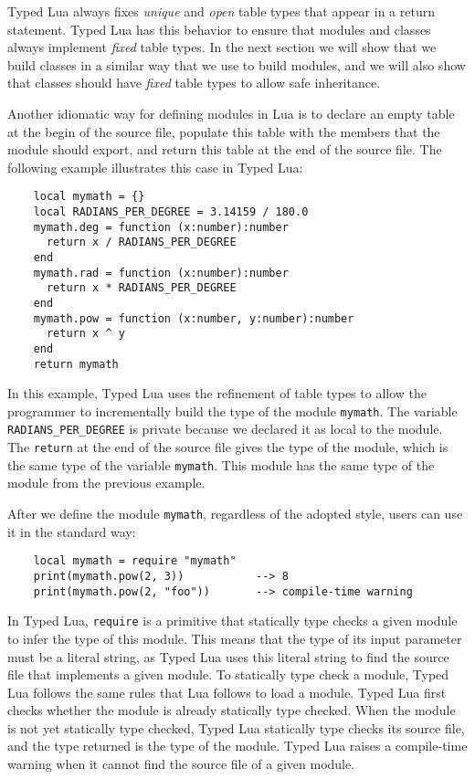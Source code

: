 Typed Lua always fixes \emph{unique} and \emph{open} table types
that appear in a return statement.
Typed Lua has this behavior to ensure that modules and classes
always implement \emph{fixed} table types.
In the next section we will show that we build classes in a
similar way that we use to build modules, and we will also show
that classes should have \emph{fixed} table types to allow safe
inheritance.

Another idiomatic way for defining modules in Lua is to declare an
empty table at the begin of the source file,
populate this table with the members that the module should export,
and return this table at the end of the source file. 
The following example illustrates this case in Typed Lua:
\begin{verbatim}
    local mymath = {}
    local RADIANS_PER_DEGREE = 3.14159 / 180.0
    mymath.deg = function (x:number):number
      return x / RADIANS_PER_DEGREE
    end
    mymath.rad = function (x:number):number
      return x * RADIANS_PER_DEGREE
    end
    mymath.pow = function (x:number, y:number):number
      return x ^ y
    end
    return mymath
\end{verbatim}

In this example, Typed Lua uses the refinement of table types to
allow the programmer to incrementally build the type of the module
\texttt{mymath}.
The variable \texttt{RADIANS\string_PER\string_DEGREE}
is private because we declared it as local to the module. 
The \texttt{return} at the end of the source file gives the
type of the module, which is the same type of the variable \texttt{mymath}.
This module has the same type of the module from the previous example.

After we define the module \texttt{mymath}, regardless of the adopted style,
users can use it in the standard way:
\begin{verbatim}
    local mymath = require "mymath"
    print(mymath.pow(2, 3))           --> 8
    print(mymath.pow(2, "foo"))       --> compile-time warning
\end{verbatim}

In Typed Lua, \texttt{require} is a primitive that statically type checks
a given module to infer the type of this module.
This means that the type of its input parameter must be a literal string,
as Typed Lua uses this literal string to find the source file that
implements a given module.
To statically type check a module, Typed Lua follows the same rules
that Lua follows to load a module.
Typed Lua first checks whether the module is already statically type checked.
When the module is not yet statically type checked, Typed Lua
statically type checks its source file, and the type returned is the
type of the module.
Typed Lua raises a compile-time warning when it cannot find the source
file of a given module.


